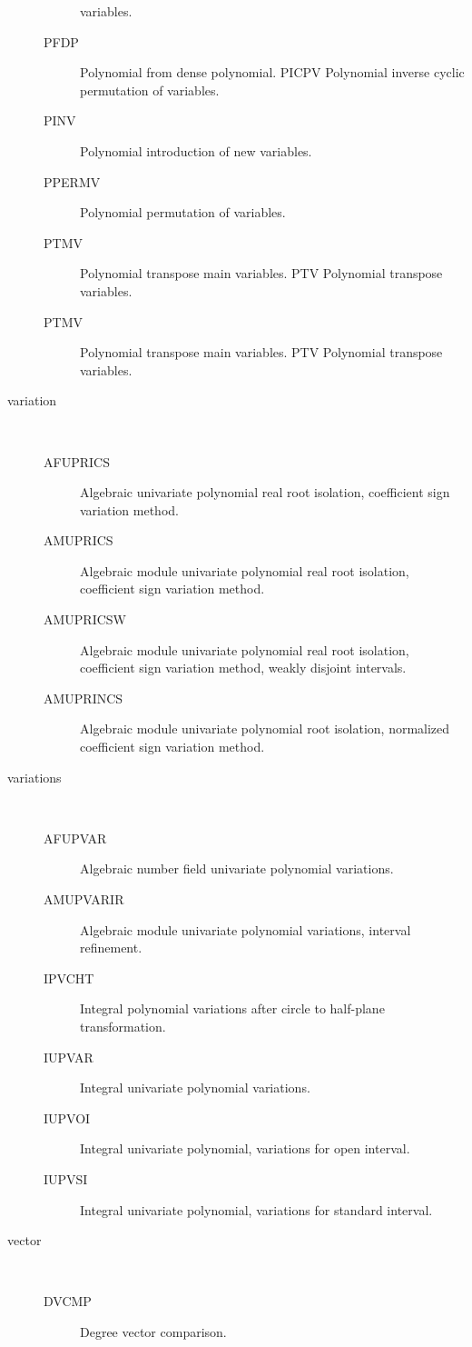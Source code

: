 \begin{description}
\begin{description}
    variables.
  \item[PFDP]  Polynomial from dense polynomial. PICPV Polynomial inverse
    cyclic permutation of variables.
  \item[PINV]  Polynomial introduction of new variables.
  \item[PPERMV]  Polynomial permutation of variables.
  \item[PTMV]  Polynomial transpose main variables. PTV Polynomial transpose
    variables.
  \item[PTMV]  Polynomial transpose main variables. PTV Polynomial transpose
    variables.
  \end{description}
\item[variation] \ \ 
  \begin{description}
  \item[AFUPRICS]  Algebraic univariate polynomial real root isolation,
    coefficient sign variation method.
  \item[AMUPRICS]  Algebraic module univariate polynomial real root isolation,
    coefficient sign variation method.
  \item[AMUPRICSW]  Algebraic module univariate polynomial real root
    isolation, coefficient sign variation method, weakly disjoint intervals.
  \item[AMUPRINCS]  Algebraic module univariate polynomial root isolation,
    normalized coefficient sign variation method.
  \end{description}
\item[variations] \ \ 
  \begin{description}
  \item[AFUPVAR]  Algebraic number field univariate polynomial variations.
  \item[AMUPVARIR]  Algebraic module univariate polynomial variations,
    interval refinement.
  \item[IPVCHT]  Integral polynomial variations after circle to half-plane
    transformation.
  \item[IUPVAR]  Integral univariate polynomial variations.
  \item[IUPVOI]  Integral univariate polynomial, variations for open interval.
  \item[IUPVSI]  Integral univariate polynomial, variations for standard
    interval.
  \end{description}
\item[vector] \ \ 
  \begin{description}
  \item[DVCMP]  Degree vector comparison.

\end{description}
\end{description}
